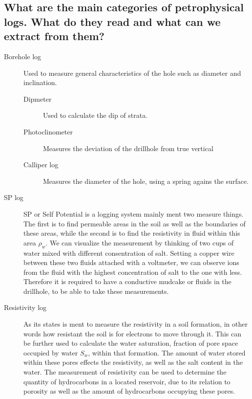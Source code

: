 \documentclass[a4paper,norsk]{article}
\begin{document}
\maketitle

\subsection*{What are the main categories of petrophysical logs. What do they read and what can we extract from them?}

\begin{description}
\item[Borehole log] Used to measure general characteristics of the hole such as diameter and inclination.
	\begin{description}
	\item[Dipmeter] Used to calculate the dip of strata.
	\item[Photoclinometer] Measures the deviation of the drillhole from true vertical
	\item[Calliper log] Measures the diameter of the hole, using a spring agains the surface.
	\end{description}
\item[SP log] SP or Self Potential is a logging system mainly ment two measure things. The first is to find permeable areas in the soil as well as the boundaries of these areas, while the second is to find the resistivity in fluid within this area $\rho_w$. We can visualize the measurement by thinking of two cups of water mixed with different consentration of salt. Setting a copper wire between these two fluids attached with a voltmeter, we can observe ions from the fluid with the highest concentration of salt to the one with less. Therefore it is required to have a conductive mudcake or fluids in the drillhole, to be able to take these measurements.
\item[Resistivity log] As its states is ment to measure the resistivity in a soil formation, in other words how resistant the soil is for electrons to move through it.
This can be further used to calculate the water saturation, fraction of pore space occupied by water $S_w$, within that formation. The amount of water stored within these pores effects the resistivity, as well as the salt content in the water.
The measurement of resistivity can be used to determine the quantity of hydrocarbons in a located reservoir, due to its relation to porosity as well as the amount of hydrocarbons occupying these pores.

\end{description}
\end{document}
